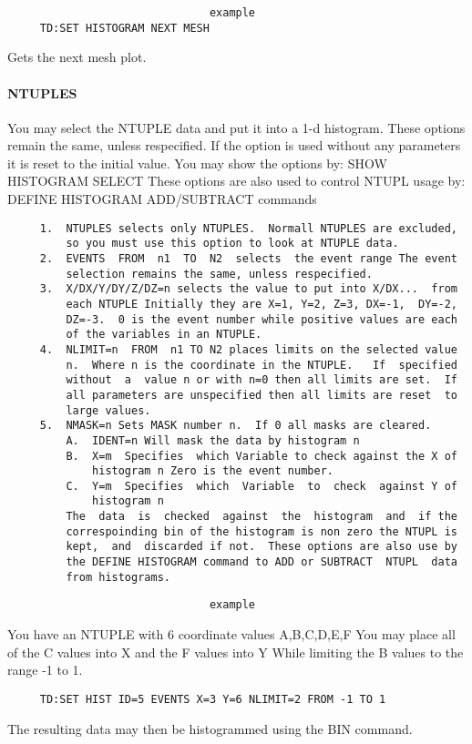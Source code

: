 \begin{verbatim}
                               example
     TD:SET HISTOGRAM NEXT MESH 
\end{verbatim}
Gets the next mesh plot.  
\paragraph{NTUPLES}
You  may  select  the  NTUPLE  data  and put it into a 1-d histogram.
These options remain the same, unless respecified.  If the option  is
used  without  any  parameters it is reset to the initial value.  You
may show the options by:   SHOW HISTOGRAM SELECT  These  options  are
also  used  to control NTUPL usage by:  DEFINE HISTOGRAM ADD/SUBTRACT
commands 
\begin{verbatim}
     1.  NTUPLES selects only NTUPLES.  Normall NTUPLES are excluded,
         so you must use this option to look at NTUPLE data.  
     2.  EVENTS  FROM  n1  TO  N2  selects  the event range The event
         selection remains the same, unless respecified.  
     3.  X/DX/Y/DY/Z/DZ=n selects the value to put into X/DX...  from
         each NTUPLE Initially they are X=1, Y=2, Z=3, DX=-1,  DY=-2,
         DZ=-3.  0 is the event number while positive values are each
         of the variables in an NTUPLE.  
     4.  NLIMIT=n  FROM  n1 TO N2 places limits on the selected value
         n.  Where n is the coordinate in the NTUPLE.   If  specified
         without  a  value n or with n=0 then all limits are set.  If
         all parameters are unspecified then all limits are reset  to
         large values.  
     5.  NMASK=n Sets MASK number n.  If 0 all masks are cleared.  
         A.  IDENT=n Will mask the data by histogram n 
         B.  X=m  Specifies  which Variable to check against the X of
             histogram n Zero is the event number.  
         C.  Y=m  Specifies  which  Variable  to  check  against Y of
             histogram n 
         The  data  is  checked  against  the  histogram  and  if the
         correspoinding bin of the histogram is non zero the NTUPL is
         kept,  and  discarded if not.  These options are also use by
         the DEFINE HISTOGRAM command to ADD or SUBTRACT  NTUPL  data
         from histograms.  
\end{verbatim}

\begin{verbatim}
                               example
\end{verbatim}
You have an NTUPLE with 6 coordinate values A,B,C,D,E,F You may place
all of the C values into X and the F values into Y While limiting the
B values to the range -1 to 1.  
\begin{verbatim}
     TD:SET HIST ID=5 EVENTS X=3 Y=6 NLIMIT=2 FROM -1 TO 1 
\end{verbatim}
The resulting data may then be histogrammed using the BIN command.  
